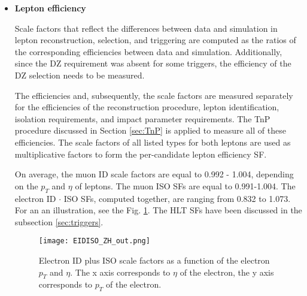 \begin{itemize}

\item{\bfseries Lepton efficiency} 

Scale factors that reflect the differences between data and simulation in lepton 
reconstruction, selection, and triggering are computed as the ratios of the corresponding
efficiencies between data and simulation. Additionally, since the DZ requirement was absent for some triggers, the efficiency of the DZ selection needs to be measured. 

The efficiencies and, subsequently, the scale factors are measured separately for the efficiencies of the reconstruction procedure, lepton identification, isolation requirements, and impact parameter requirements. The TnP procedure discussed in Section \ref{sec:TnP} is applied to measure all of these efficiencies. The scale factors of all listed types for both leptons are used as multiplicative factors
to form the per-candidate lepton efficiency SF.

On average, the muon ID scale factors are equal to 0.992 - 1.004, depending on the $p_T$ and $\eta$ of leptons. The muon ISO SFs are equal to 0.991-1.004. The electron ID $\cdot$ ISO SFs, computed together, are ranging from 0.832 to 1.073. For an an illustration, see the Fig. \ref{fig:eleIDnISO_SF}. The HLT SFs have been discussed in the subsection \ref{sec:triggers}. 



%
%

\begin{figure}[H]
\centering
\texttt{[image: EIDISO\_ZH\_out.png]}
\caption[Electron ID plus ISO scale factors.]{ Electron ID plus ISO scale factors as a function of the electron $p_{T}$ and $\eta$. The x axis corresponds to $\eta$ of the electron, the y axis corresponds to $p_T$ of the electron.}
\label{fig:eleIDnISO_SF}
\end{figure}





\end{itemize}
